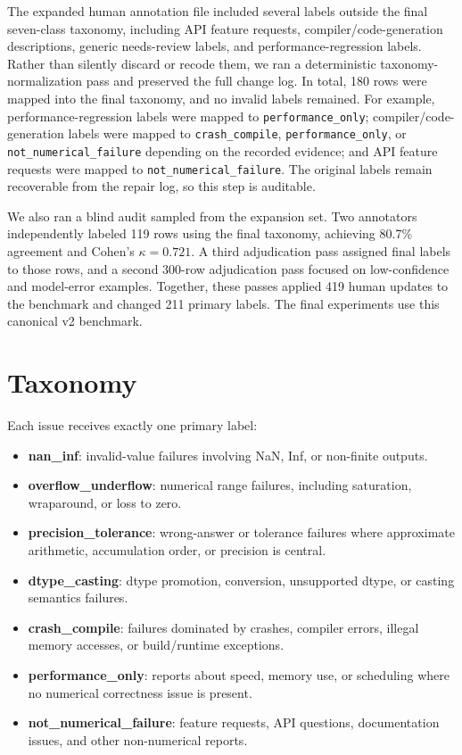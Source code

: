 \documentclass[conference]{IEEEtran}
\begin{document}
The expanded human annotation file included several labels outside the final
seven-class taxonomy, including API feature requests, compiler/code-generation
descriptions, generic needs-review labels, and performance-regression labels.
Rather than silently discard or recode them, we ran a deterministic
taxonomy-normalization pass and preserved the full change log. In total, 180
rows were mapped into the final taxonomy, and no invalid labels remained. For
example, performance-regression labels were mapped to \texttt{performance\_only};
compiler/code-generation labels were mapped to \texttt{crash\_compile},
\texttt{performance\_only}, or \texttt{not\_numerical\_failure} depending on
the recorded evidence; and API feature requests were mapped to
\texttt{not\_numerical\_failure}. The original labels remain recoverable from
the repair log, so this step is auditable.

We also ran a blind audit sampled from the expansion set. Two annotators
independently labeled 119 rows using the final taxonomy, achieving 80.7\%
agreement and Cohen's $\kappa=0.721$. A third adjudication pass assigned final
labels to those rows, and a second 300-row adjudication pass focused on
low-confidence and model-error examples. Together, these passes applied 419
human updates to the benchmark and changed 211 primary labels. The final
experiments use this canonical v2 benchmark.

\section{Taxonomy}

Each issue receives exactly one primary label:
\begin{itemize}
    \item \textbf{nan\_inf}: invalid-value failures involving NaN, Inf, or
    non-finite outputs.
    \item \textbf{overflow\_underflow}: numerical range failures, including
    saturation, wraparound, or loss to zero.
    \item \textbf{precision\_tolerance}: wrong-answer or tolerance failures
    where approximate arithmetic, accumulation order, or precision is central.
    \item \textbf{dtype\_casting}: dtype promotion, conversion, unsupported
    dtype, or casting semantics failures.
    \item \textbf{crash\_compile}: failures dominated by crashes, compiler
    errors, illegal memory accesses, or build/runtime exceptions.
    \item \textbf{performance\_only}: reports about speed, memory use, or
    scheduling where no numerical correctness issue is present.
    \item \textbf{not\_numerical\_failure}: feature requests, API questions,
    documentation issues, and other non-numerical reports.
\end{itemize}
\end{document}
